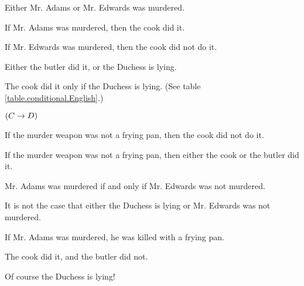 \problempart 
\begin{earg}
\item Either Mr. Adams or Mr. Edwards was murdered.
\item[] 
\item If Mr. Adams was murdered, then the cook did it.
\item[] 
\item If Mr. Edwards was murdered, then the cook did not do it.
\item[] 
\item Either the butler did it, or the Duchess is lying.
\item[] 
\item The cook did it only if the Duchess is lying. (See table \ref{table.conditional.English}.) 
\item[] $(C \rightarrow D)$
\item If the murder weapon was not a frying pan, then the cook did not do it.
\item[] 
\item If the murder weapon was not a frying pan, then either the cook or the butler did it.
\item[] 
\item Mr. Adams was murdered if and only if Mr. Edwards was not murdered.
\item[] 
\item It is not the case that either the Duchess is lying or Mr. Edwards was not murdered.
\item[] 
\item If Mr. Adams was murdered, he was killed with a frying pan.
\item[] 
\item The cook did it, and the butler did not.
\item[] 
\item Of course the Duchess is lying!
\item[] 
\end{earg}


